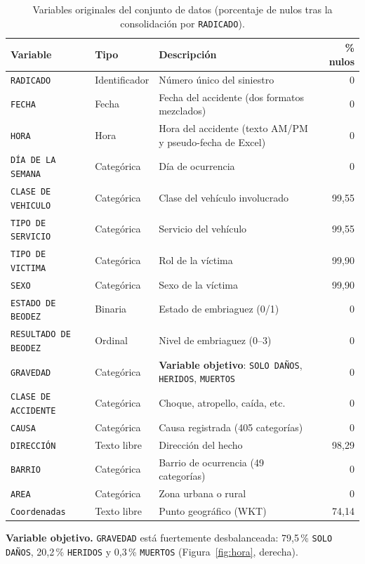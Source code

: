 \documentclass[11pt]{article}
\newcommand{\vartxt}[1]{\texttt{#1}}
\begin{document}
\begin{table}[H]
\centering\small
\caption{Variables originales del conjunto de datos (porcentaje de nulos tras la consolidación por \vartxt{RADICADO}).}
\label{tab:variables}
\begin{tabular}{p{3.3cm} p{2.2cm} p{6.6cm} r}
\toprule
\textbf{Variable} & \textbf{Tipo} & \textbf{Descripción} & \textbf{\% nulos} \\
\midrule
\vartxt{RADICADO} & Identificador & Número único del siniestro & 0 \\
\vartxt{FECHA} & Fecha & Fecha del accidente (dos formatos mezclados) & 0 \\
\vartxt{HORA} & Hora & Hora del accidente (texto AM/PM y pseudo-fecha de Excel) & 0 \\
\vartxt{DÍA DE LA SEMANA} & Categórica & Día de ocurrencia & 0 \\
\vartxt{CLASE DE VEHICULO} & Categórica & Clase del vehículo involucrado & 99,55 \\
\vartxt{TIPO DE SERVICIO} & Categórica & Servicio del vehículo & 99,55 \\
\vartxt{TIPO DE VICTIMA} & Categórica & Rol de la víctima & 99,90 \\
\vartxt{SEXO} & Categórica & Sexo de la víctima & 99,90 \\
\vartxt{ESTADO DE BEODEZ} & Binaria & Estado de embriaguez (0/1) & 0 \\
\vartxt{RESULTADO DE BEODEZ} & Ordinal & Nivel de embriaguez (0--3) & 0 \\
\vartxt{GRAVEDAD} & Categórica & \textbf{Variable objetivo}: \vartxt{SOLO DAÑOS}, \vartxt{HERIDOS}, \vartxt{MUERTOS} & 0 \\
\vartxt{CLASE DE ACCIDENTE} & Categórica & Choque, atropello, caída, etc. & 0 \\
\vartxt{CAUSA} & Categórica & Causa registrada (405 categorías) & 0 \\
\vartxt{DIRECCIÓN} & Texto libre & Dirección del hecho & 98,29 \\
\vartxt{BARRIO} & Categórica & Barrio de ocurrencia (49 categorías) & 0 \\
\vartxt{AREA} & Categórica & Zona urbana o rural & 0 \\
\vartxt{Coordenadas} & Texto libre & Punto geográfico (WKT) & 74,14 \\
\bottomrule
\end{tabular}
\end{table}

\textbf{Variable objetivo.} \vartxt{GRAVEDAD} está fuertemente desbalanceada: 79,5\,\% \vartxt{SOLO DAÑOS}, 20,2\,\% \vartxt{HERIDOS} y 0,3\,\% \vartxt{MUERTOS} (Figura~\ref{fig:hora}, derecha).
\end{document}
